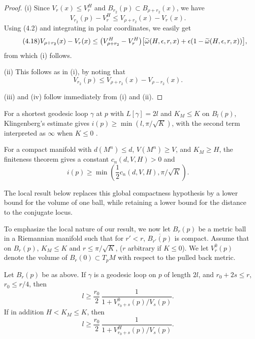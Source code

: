 \begin{proof}
\sketch
\textup{(i)} Since $V_r(x)\le V_r^H$ and $B_{r_2}(p)\subset B_{\rho+r_2}(x)$, we have
\begin{equation}\tag{4.17}
V_{r_2}(p)-V_r^H\le V_{\rho+r_2}(x)-V_r(x).
\end{equation}
Using (4.2) and integrating in polar coordinates, we easily get
\begin{equation}\tag{4.18}
V_{\rho+r_2}(x)-V_r(x)\le
\bigl(V^H_{\rho+r_2}-V_r^H\bigr)\bigl[\widetilde{\omega}(H,\epsilon,r,x)+\epsilon(1-\widetilde{\omega}(H,\epsilon,r,x))\bigr],
\end{equation}
from which (i) follows.

\textup{(ii)} This follows as in (i), by noting that
\begin{equation}
\tag{4.19}
V_{r_2}(p) \leq V_{\rho+r_2}(x) - V_{\rho-r_2}(x).
\end{equation}

\textup{(iii)} and (iv) follow immediately from (i) and (ii).
\end{proof}

For a shortest geodesic loop $\gamma$ at $p$ with $L[\gamma]=2l$ and
$K_M\leq K$ on $B_l(p)$, Klingenberg's estimate gives
$i(p)\geq\min(l,\pi/\sqrt K)$, with the second term interpreted as $\infty$
when $K\leq0$ \cite{cgt-cheeger-ebin}.

For a compact manifold with $d(M^n)\leq d$, $V(M^n)\geq V$, and
$K_M\geq H$, the finiteness theorem \cite{cgt-cheeger-finiteness} gives a
constant $c_n(d,V,H)>0$ and
\begin{equation}
\tag{4.20}
i(p)\geq \min\left(\frac12c_n(d,V,H),\pi/\sqrt K\right).
\end{equation}

The local result below replaces this global compactness hypothesis by a lower
bound for the volume of one ball, while retaining a lower bound for the
distance to the conjugate locus.

To emphasize the local nature of our result, we now let $B_r(p)$ be a metric
ball in a Riemannian manifold such that for $r' < r$, $\overline{B_{r'}(p)}$ is
compact. Assume that on $B_r(p)$, $K_M \le K$ and $r \le \pi/\sqrt{K}$, ($r$
arbitrary if $K \le 0$). We let $V_r^0(p)$ denote the volume of $B_r(0) \subset
T_pM$ with respect to the pulled back metric.

\begin{theorem}
\label{thm:local-injectivity-radius-bound}

Let $B_r(p)$ be as above. If $\gamma$ is a geodesic loop on $p$ of length
$2l$, and $r_0+2s \le r$, $r_0 \le r/4$, then
\begin{equation}\tag{4.21}
l \ge \frac{r_0}{2}\,\frac{1}{1+V^0_{r_0+s}(p)/V_s(p)}.
\end{equation}
If in addition $H < K_M \le K$, then
\begin{equation}\tag{4.22}
l \ge \frac{r_0}{2}\,\frac{1}{1+V^H_{r_0+s}(p)/V_s(p)}.
\end{equation}
\end{theorem}

